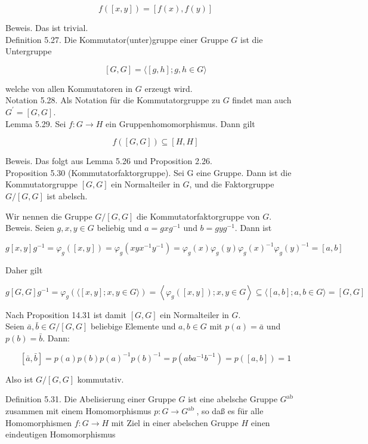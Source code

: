 \documentclass[10pt, letterpaper]{article}
\begin{document}
$$
f([x, y])=[f(x), f(y)]
$$

Beweis. Das ist trivial.\\
Definition 5.27. Die Kommutator(unter)gruppe einer Gruppe $G$ ist die Untergruppe

$$
[G, G]=\langle[g, h] ; g, h \in G\rangle
$$

welche von allen Kommutatoren in $G$ erzeugt wird.\\
Notation 5.28. Als Notation für die Kommutatorgruppe zu $G$ findet man auch $G^{\prime}=[G, G]$.\\
Lemma 5.29. Sei $f: G \rightarrow H$ ein Gruppenhomomorphismus. Dann gilt

$$
f([G, G]) \subseteq[H, H]
$$

Beweis. Das folgt aus Lemma 5.26 und Proposition 2.26.\\
Proposition 5.30 (Kommutatorfaktorgruppe). Sei G eine Gruppe. Dann ist die Kommutatorgruppe $[G, G]$ ein Normalteiler in $G$, und die Faktorgruppe $G /[G, G]$ ist abelsch.

Wir nennen die Gruppe $G /[G, G]$ die Kommutatorfaktorgruppe von $G$.\\
Beweis. Seien $g, x, y \in G$ beliebig und $a=g x g^{-1}$ und $b=g y g^{-1}$. Dann ist

$$
g[x, y] g^{-1}=\varphi_{g}([x, y])=\varphi_{g}\left(x y x^{-1} y^{-1}\right)=\varphi_{g}(x) \varphi_{g}(y) \varphi_{g}(x)^{-1} \varphi_{g}(y)^{-1}=[a, b]
$$

Daher gilt

$$
g[G, G] g^{-1}=\varphi_{g}(\langle[x, y] ; x, y \in G\rangle)=\left\langle\varphi_{g}([x, y]) ; x, y \in G\right\rangle \subseteq\langle[a, b] ; a, b \in G\rangle=[G, G]
$$

Nach Proposition 14.31 ist damit $[G, G]$ ein Normalteiler in $G$.\\
Seien $\bar{a}, \bar{b} \in G /[G, G]$ beliebige Elemente und $a, b \in G$ mit $p(a)=\bar{a}$ und $p(b)=\bar{b}$. Dann:

$$
[\bar{a}, \bar{b}]=p(a) p(b) p(a)^{-1} p(b)^{-1}=p\left(a b a^{-1} b^{-1}\right)=p([a, b])=1
$$

Also ist $G /[G, G]$ kommutativ.

Definition 5.31. Die Abelisierung einer Gruppe $G$ ist eine abelsche Gruppe $G^{\text {ab }}$ zusammen mit einem Homomorphismus $p: G \rightarrow G^{\text {ab }}$, so daß es für alle Homomorphismen $f: G \rightarrow H$ mit Ziel in einer abelschen Gruppe $H$ einen eindeutigen Homomorphismus
\end{document}
